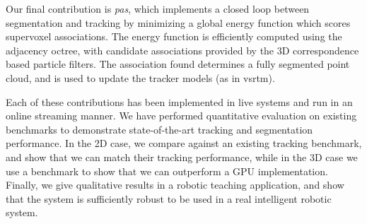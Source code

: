 Our final contribution is \emph{\gls{pas}}, which implements a closed loop between segmentation and tracking by minimizing a global energy function which scores supervoxel associations. The energy function is efficiently computed using the adjacency octree, with candidate associations provided by the 3D correspondence based particle filters. The association found determines a fully segmented point cloud, and is used to update the tracker models (as in \gls{vsrtm}).

Each of these contributions has been implemented in live systems and run in an online streaming manner. We have performed quantitative evaluation on existing benchmarks to demonstrate state-of-the-art tracking and segmentation performance. In the 2D case, we compare against an existing tracking benchmark, and show that we can match their tracking performance, while in the 3D case we use a benchmark to show that we can outperform a GPU implementation. Finally, we give qualitative results in a robotic teaching application, and show that the system is sufficiently robust to be used in a real intelligent robotic system.